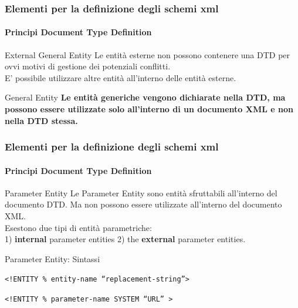 \begin{frame}
    \frametitle{Elementi per la definizione degli schemi xml}
    \framesubtitle{Principi Document Type Definition}
    \addtocounter{nframe}{1}

    \begin{block}{External General Entity}
        Le entità esterne non possono contenere una DTD per ovvi motivi di gestione dei potenziali conflitti.
        \\E' possibile utilizzare altre entità all'interno delle entità esterne. 
    \end{block}

    \begin{block}{General Entity}
     \textbf{Le entità generiche vengono dichiarate nella DTD, ma possono essere utilizzate solo all'interno di un documento XML e non nella DTD stessa.}
    \end{block}
\end{frame}

\begin{frame}
    \frametitle{Elementi per la definizione degli schemi xml}
    \framesubtitle{Principi Document Type Definition}
    \addtocounter{nframe}{1}

    \begin{block}{Parameter Entity}
        Le Parameter Entity sono entità sfruttabili all'interno del documento DTD. Ma non possono essere utilizzate all'interno del documento XML.
        \\ Esestono due tipi di entità parametriche: 
        \\1) \textbf{internal}  parameter entities 2) the \textbf{external} parameter entities.
    \end{block}

    \begin{block}{Parameter Entity: Sintassi}
        \begin{center}\texttt{<!ENTITY \% entity-name ``replacement-string''>}\end{center}
        \begin{center}\texttt{<!ENTITY \% parameter-name SYSTEM ``URL'' >}\end{center}
    \end{block}
\end{frame}

